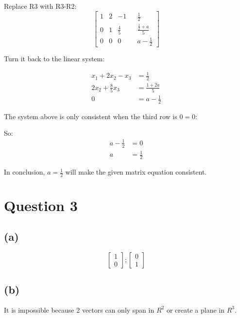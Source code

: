 \documentclass[10pt]{article}
\begin{document}
\noindent Replace R3 with R3-R2:
\begin{equation*}
    \begin{bmatrix}
        1 & 2 & -1 && \frac{1}{2} \\
        0 & 1 & \frac{4}{5} && \frac{\frac{1}{2} + a}{5} \\
        0 & 0 & 0 && a - \frac{1}{2}
    \end{bmatrix}
\end{equation*}


\noindent Turn it back to the linear system:

\begin{align*}
    x_1 + 2x_2 - x_3 &= \frac{1}{2} \\
    2x_2 + \frac{8}{5}x_3 &= \frac{1 + 2a}{5} \\
    0 &= a - \frac{1}{2}
\end{align*}

\noindent The system above is only consistent when the third row is $0=0$: \par
\noindent So:
\begin{align*}
    a - \frac{1}{2} &= 0 \\
    a &= \frac{1}{2}
\end{align*}

\noindent In conclusion, $a = \frac{1}{2}$ will make the given matrix equation consistent.

\section*{Question 3}
\subsection*{(a)}
\begin{equation*}
    \begin{bmatrix}
        1 \\
        0
    \end{bmatrix};
    \begin{bmatrix}
        0 \\
        1
    \end{bmatrix}
\end{equation*}

\subsection*{(b)}
\noindent It is impossible because 2 vectors can only span in $R^2$ or create a plane in $R^3$.
\end{document}
